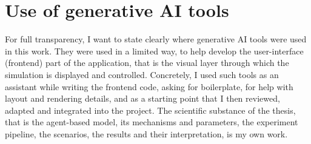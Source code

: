 \section{Use of generative AI tools}

For full transparency, I want to state clearly where generative AI tools were used in this work. They were used in a limited way, to help develop the user-interface (frontend) part of the application, that is the visual layer through which the simulation is displayed and controlled. Concretely, I used such tools as an assistant while writing the frontend code, asking for boilerplate, for help with layout and rendering details, and as a starting point that I then reviewed, adapted and integrated into the project. The scientific substance of the thesis, that is the agent-based model, its mechanisms and parameters, the experiment pipeline, the scenarios, the results and their interpretation, is my own work.